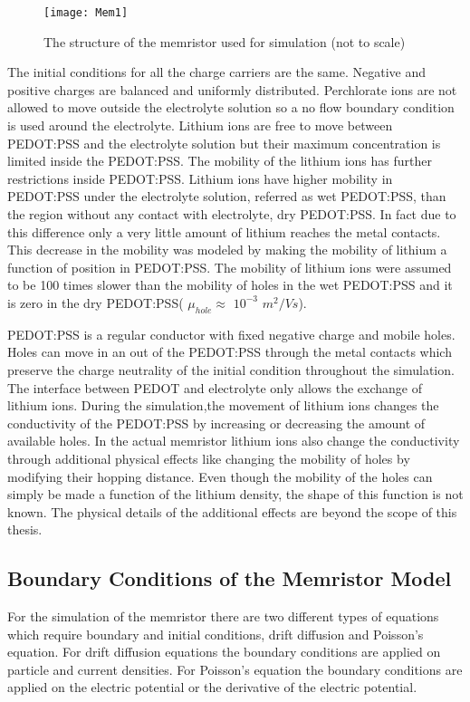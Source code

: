 \begin{doublespace}
\begin{figure}[!htp]
\centering
\texttt{[image: Mem1]}
\caption{The structure of the memristor used for simulation (not to scale)} 
\label{MemStc}
\end{figure}


The initial conditions for all the charge carriers are the same. Negative and positive charges are balanced and uniformly distributed. Perchlorate ions are not allowed to move outside the electrolyte solution so a no flow boundary condition is used around the electrolyte. Lithium ions are free to move between PEDOT:PSS and the electrolyte solution but their maximum concentration is limited inside the PEDOT:PSS. The mobility of the lithium ions has further restrictions inside PEDOT:PSS. Lithium ions have higher mobility in PEDOT:PSS under the electrolyte solution, referred as wet PEDOT:PSS, than the region without any contact with electrolyte, dry PEDOT:PSS. In fact due to this difference only a very little amount of lithium reaches the metal contacts. This decrease in the mobility was modeled by making the mobility of lithium a function of position in PEDOT:PSS. The mobility of lithium ions were assumed to be 100 times slower than the mobility of holes in the wet PEDOT:PSS and it is zero in the dry PEDOT:PSS( $\mu_{hole} \approx$ $10^{-3}$ $m^2/Vs$). 


PEDOT:PSS is a regular conductor with fixed negative charge and mobile holes. Holes can move in an out of the PEDOT:PSS through the metal contacts which preserve the charge neutrality of the initial condition throughout the simulation. The interface between PEDOT and electrolyte only allows the exchange of lithium ions. During the simulation,the movement of lithium ions changes the conductivity of the PEDOT:PSS by increasing or decreasing the amount of available holes. In the actual memristor lithium ions also change the conductivity through additional physical effects like changing the mobility of holes by modifying their hopping distance. Even though the mobility of the holes can simply be made a function of the lithium density, the shape of this function is not known. The physical details of the additional effects are beyond the scope of this thesis. 

\subsection{Boundary Conditions of the Memristor Model}

For the simulation of the memristor there are two different types of equations which require boundary and initial conditions, drift diffusion and Poisson's equation. For drift diffusion equations the boundary conditions are applied on particle and current densities. For Poisson's equation the boundary conditions are applied on the electric potential or the derivative of the electric potential.
 

\end{doublespace}
